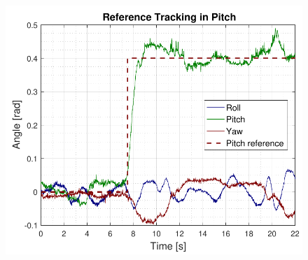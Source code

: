 \begin{figure}[H]
    \includegraphics[scale=.65]{figures/AccepttestRefTrackPitch.pdf}
    \centering			
    \label{fig:AccepttestRefTrackPitch}
\end{figure}

